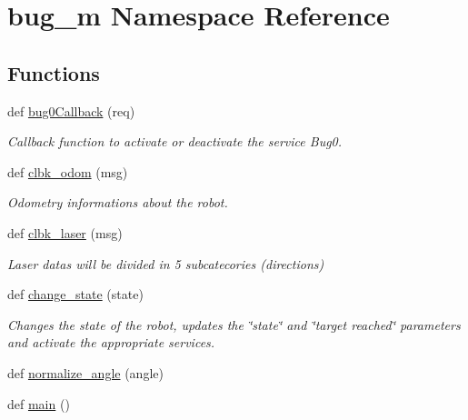 \hypertarget{namespacebug__m}{}\section{bug\+\_\+m Namespace Reference}
\label{namespacebug__m}
\subsection*{Functions}
\begin{DoxyCompactItemize}
\item 
def \hyperlink{namespacebug__m_add2465382834c48e8e5ec6e361fb6eec}{bug0\+Callback} (req)
\begin{DoxyCompactList}\small\item\em Callback function to activate or deactivate the service Bug0. \end{DoxyCompactList}\item 
def \hyperlink{namespacebug__m_a27cfd2a326148157d3e5e0affbe763f3}{clbk\+\_\+odom} (msg)
\begin{DoxyCompactList}\small\item\em Odometry informations about the robot. \end{DoxyCompactList}\item 
def \hyperlink{namespacebug__m_a6ab3d92b5b6ea12eaa52bf21cfa111f1}{clbk\+\_\+laser} (msg)
\begin{DoxyCompactList}\small\item\em Laser datas will be divided in 5 subcatecories (directions) \end{DoxyCompactList}\item 
def \hyperlink{namespacebug__m_aca19305feae5c5489e7452e921fcbd9c}{change\+\_\+state} (state)
\begin{DoxyCompactList}\small\item\em Changes the state of the robot, updates the \char`\"{}state\char`\"{} and \char`\"{}target reached\char`\"{} parameters and activate the appropriate services. \end{DoxyCompactList}\item 
def \hyperlink{namespacebug__m_a6547c5ebcd1d3aa3e104a5b573e47862}{normalize\+\_\+angle} (angle)
\item 
def \hyperlink{namespacebug__m_a357589ad533151302b9fa9a893833382}{main} ()
\end{DoxyCompactItemize}
